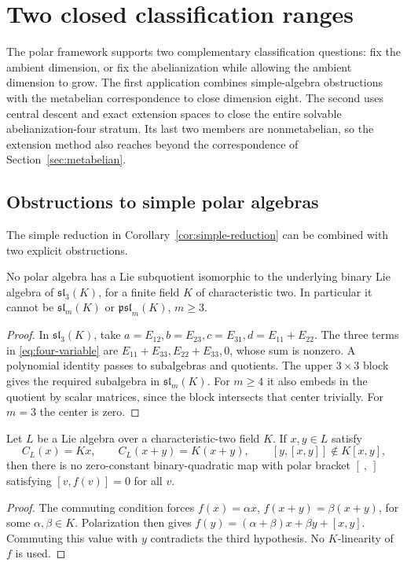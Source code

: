 \section{Two closed classification ranges}
\label{sec:classification}

The polar framework supports two complementary classification questions:
fix the ambient dimension, or fix the abelianization while allowing the
ambient dimension to grow. The first application combines simple-algebra
obstructions with the metabelian correspondence to close dimension eight.
The second uses central descent and exact extension spaces to close the
entire solvable abelianization-four stratum. Its last two members are
nonmetabelian, so the extension method also reaches beyond the
correspondence of Section~\ref{sec:metabelian}.

\subsection{Obstructions to simple polar algebras}

The simple reduction in Corollary~\ref{cor:simple-reduction} can be
combined with two explicit obstructions.

\begin{proposition}\label{prop:matrix-obstruction}
No polar algebra has a Lie subquotient isomorphic to the underlying
binary Lie algebra of \(\mathfrak{sl}_3(K)\), for a finite field \(K\)
of characteristic two. In particular it cannot be
\(\mathfrak{sl}_m(K)\) or \(\mathfrak{psl}_m(K)\), \(m\ge3\).
\end{proposition}
\begin{proof}
In \(\mathfrak{sl}_3(K)\), take
\(a=E_{12},b=E_{23},c=E_{31},d=E_{11}+E_{22}\).
The three terms in \eqref{eq:four-variable} are
\(E_{11}+E_{33},E_{22}+E_{33},0\), whose sum is nonzero.
A polynomial identity passes to subalgebras and quotients.
The upper \(3\times3\) block gives the required subalgebra in
\(\mathfrak{sl}_m(K)\). For \(m\ge4\) it also embeds in the quotient
by scalar matrices, since the block intersects that center trivially.
For \(m=3\) the center is zero.
\end{proof}

\begin{lemma}\label{lem:two-centralizers}
Let \(L\) be a Lie algebra over a characteristic-two field \(K\).
If \(x,y\in L\) satisfy
\[
 C_L(x)=Kx,\qquad C_L(x+y)=K(x+y),\qquad
 [y,[x,y]]\notin K[x,y],
\]
then there is no zero-constant binary-quadratic map with polar bracket
\([\ ,\ ]\) satisfying \([v,f(v)]=0\) for all \(v\).
\end{lemma}
\begin{proof}
The commuting condition forces
\(f(x)=\alpha x\), \(f(x+y)=\beta(x+y)\), for some \(\alpha,\beta\in K\).
Polarization then gives
\(f(y)=(\alpha+\beta)x+\beta y+[x,y]\).
Commuting this value with \(y\) contradicts the third hypothesis.
No \(K\)-linearity of \(f\) is used.
\end{proof}

